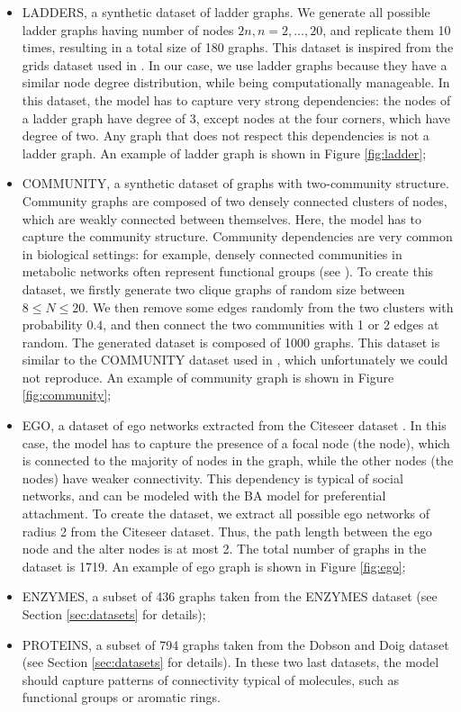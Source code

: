 \begin{itemize}
    \item LADDERS, a synthetic dataset of ladder graphs. We generate all possible ladder graphs having number of nodes $2n, n = 2, \ldots, 20$, and replicate them 10 times, resulting in a total size of 180 graphs. This dataset is inspired from the grids dataset used in \citep{you2018graphrnn}. In our case, we use ladder graphs because they have a similar node degree distribution, while being computationally manageable. In this dataset, the model has to capture very strong dependencies: the nodes of a ladder graph have degree of 3, except nodes at the four corners, which have degree of two. Any graph that does not respect this dependencies is not a ladder graph. An example of ladder graph is shown in Figure \ref{fig:ladder};
    \item COMMUNITY, a synthetic dataset of graphs with two-community structure. Community graphs are composed of two densely connected clusters of nodes, which are weakly connected between themselves. Here, the model has to capture the community structure. Community dependencies are very common in biological settings: for example, densely connected communities in metabolic networks often represent functional groups (see \eg \citep{girvan2002commstructsocialbionet}). To create this dataset, we firstly generate two clique graphs of random size between $8 \leq N \leq 20$. We then remove some edges randomly from the two clusters with probability $0.4$, and then connect the two communities with 1 or 2 edges at random. The generated dataset is composed of 1000 graphs. This dataset is similar to the COMMUNITY dataset used in \citep{you2018graphrnn}, which unfortunately we could not reproduce. An example of community graph is shown in Figure \ref{fig:community};
    \item EGO, a dataset of ego networks extracted from the Citeseer dataset \citep{giles1998citeseer}. In this case, the model has to capture the presence of a focal node (the  node), which is connected to the majority of nodes in the graph, while the other nodes (the  nodes) have weaker connectivity. This dependency is typical of social networks, and can be modeled with the BA model for preferential attachment. To create the dataset, we extract all possible ego networks of radius 2 from the Citeseer dataset. Thus, the path length between the ego node and the alter nodes is at most 2. The total number of graphs in the dataset is 1719. An example of ego graph is shown in Figure \ref{fig:ego};
    \item ENZYMES, a subset of 436 graphs taken from the ENZYMES dataset \citep{schomburg2004enzymes} (see Section \ref{sec:datasets} for details);
    \item PROTEINS, a subset of 794 graphs taken from the Dobson and Doig dataset \citep{dobson2003dd} (see Section \ref{sec:datasets} for details). In these two last datasets, the model should capture patterns of connectivity typical of molecules, such as functional groups or aromatic rings.
\end{itemize}
